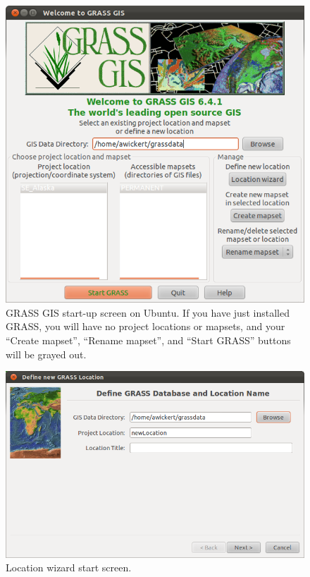 \documentclass{book}
\begin{document}
\begin{figure}[h]
 \begin{center}
 \includegraphics[width=.9\linewidth]{figures/ubuntu/main_screen.png}
 \caption{GRASS GIS start-up screen on Ubuntu. If you have just installed GRASS, you will have no project locations or mapsets, and your ``Create mapset'', ``Rename mapset'', and ``Start GRASS'' buttons will be grayed out.}
 \label{fig:startup_screen}
 \end{center}
\end{figure}

\begin{figure}[h]
 \begin{center}
 \includegraphics[width=.9\linewidth]{figures/ubuntu/location_wizard_start.png}
 \caption{Location wizard start screen.}
 \label{fig:location_wizard_start}
 \end{center}
\end{figure}
\end{document}
